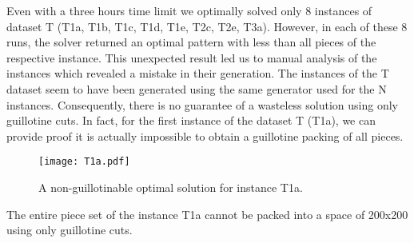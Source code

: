 \documentclass[ppgc,tese,english,formais,babel]{iiufrgs}
\begin{document}
\begin{comment}
Instances for which we proved infeasibility:
jl_yMhj5m T1a
jl_meyQRn T1b
jl_IJhWMm T1c
jl_aGVVYp T1d
jl_on4aRl T1e
jl_axD9ro T2c
jl_idk5Cm T2e
jl_61BNyp T3a
\end{comment}

Even with a three hours time limit we optimally solved only 8 instances of dataset T (T1a, T1b, T1c, T1d, T1e, T2c, T2e, T3a).
However, in each of these 8 runs, the solver returned an optimal pattern with less than all pieces of the respective instance.
This unexpected result led us to manual analysis of the instances which revealed a mistake in their generation.
The instances of the T dataset seem to have been generated using the same generator used for the N instances.
Consequently, there is no guarantee of a wasteless solution using only guillotine cuts.
In fact, for the first instance of the dataset T (T1a), we can provide proof it is actually impossible to obtain a guillotine packing of all pieces.

\begin{figure}[h]
  \caption{A non-guillotinable optimal solution for instance T1a.}
  \center
  \texttt{[image: T1a.pdf]}
  \label{fig:T1a}
\end{figure}

\begin{proposition}
The entire piece set of the instance T1a cannot be packed into a space of 200x200 using only guillotine cuts.
\end{proposition}
\end{document}
